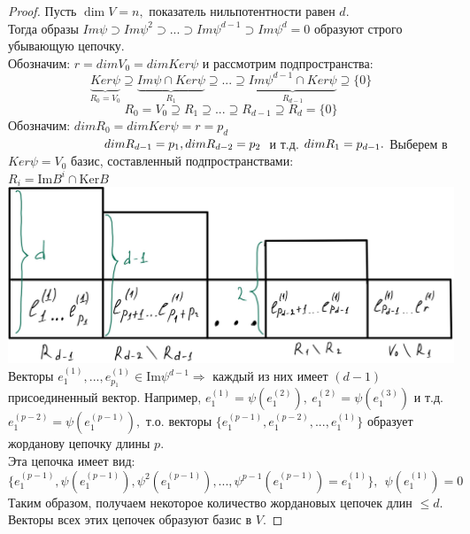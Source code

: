 \documentclass[a4paper, 12pt]{article}
\newcommand\tab[1][.5cm]{\hspace*{#1}}
\theoremstyle{definition}
\begin{document}
    \begin{proof}
        Пусть $\dim V = n,$ показатель нильпотентности равен $d$.
        \\Тогда образы $Im \psi \supset Im \psi^2 \supset...\supset
        Im \psi^{d-1} \supset Im \psi^d = 0$ образуют строго
        убывающую цепочку.\\
        Обозначим: $r = dim V_0 = dimKer \psi$
        и рассмотрим подпространства: $$\underbrace{Ker \psi}_{R_0 = V_0}
        \supseteq \underbrace{Im \psi \cap Ker \psi}_{R_1} \supseteq...\supseteq
        \underbrace{Im \psi^{d-1} \cap Ker \psi}_{R_{d-1}}\supseteq \{0\}$$
        $$R_0 = V_0 \supseteq R_1 \supseteq...\supseteq R_{d-1}
        \supseteq R_d = \{0\}$$
        Обозначим:
        $dim R_0 = dim Ker \psi = r = p_d$\\
        $\tab[2.7cm] dim R_{d-1} = p_1,
        dim R_{d-2} = p_2$ и т.д. $dim R_1 = p_{d-1}.\\\\$
        Выберем в $Ker \psi = V_0$ базис, составленный
        подпространствами:\\ $R_i = \text{Im}B^i \cap \text{Ker}B$\\
        \includegraphics[scale = 0.22]{images/table1.JPG}\\
        Векторы $e_1^{(1)},...,e_{p_1}^{(1)} \in \text{Im}\psi
        ^{d-1} \Longrightarrow$ каждый из них имеет $(d-1)$
        присоединенный вектор.
        Например, $e_1^{(1)} = \psi(e_1^{(2)}),\ e_1^{(2)} =
        \psi(e_1^{(3)})$ и т.д.\\
        $e_1^{(p-2)} = \psi(e_1^{(p-1)}),$ т.о. векторы
        $\{e_1^{(p-1)}, e_1^{(p-2)},...,e_1^{(1)}\}$ образует 
        жорданову цепочку длины $p$. \\
        Эта цепочка имеет вид: $$\{e_1^{(p-1)}, \psi(e_1^
        {(p-1)}), \psi^2(e_1^{(p-1)}),...,\psi^{p-1}(e_1^
        {(p-1)}) = e_1^{(1)}\},\ \ \psi(e_1^{(1)}) = 0$$
        Таким образом, получаем некоторое количество
        жордановых цепочек длин $\leq d$. Векторы всех этих
        цепочек образуют базис в $V$.  
    \end{proof}
\end{document}
